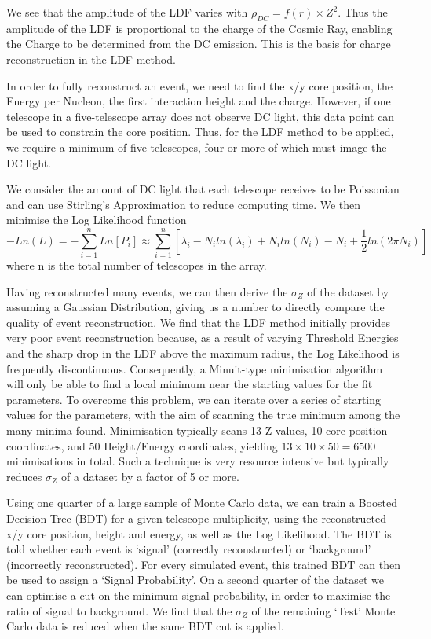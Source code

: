 \documentclass{article}
\begin{document}
We see that the amplitude of the LDF varies with $ \rho_{DC}  = f(r) \times Z^{2}$. Thus the amplitude of the LDF is proportional to the charge of the Cosmic Ray, enabling the Charge to be determined from the DC emission. This is the basis for charge reconstruction in the LDF method. 

In order to fully reconstruct an event, we need to find the x/y core position, the Energy per Nucleon, the first interaction height and the charge. However, if one telescope in a five-telescope array does not observe DC light, this data point can be used to constrain the core position. Thus, for the LDF method to be applied, we require a minimum of five telescopes, four or more of which must image the DC light.

We consider the amount of DC light that each telescope receives to be Poissonian and can use Stirling's Approximation to reduce computing time. We then minimise the Log Likelihood function \[ - Ln(L) = - \sum_{i=1}^{n} Ln [P_{i}] \approx  \sum_{i=1}^{n} [\lambda _{i} - N_{i} ln(\lambda _{i}) + N_{i} ln(N_{i}) - N_{i} + \frac{1}{2} ln(2 \pi N_{i})]  \]
where n is the total number of telescopes in the array.

Having reconstructed many events, we can then derive the $\sigma_{Z}$ of the dataset by assuming a Gaussian Distribution, giving us a number to directly compare the quality of event reconstruction. We find that the LDF method initially provides very poor event reconstruction because, as a result of varying Threshold Energies and the sharp drop in the LDF above the maximum radius, the Log Likelihood is frequently discontinuous. Consequently, a Minuit-type minimisation algorithm will only be able to find a local minimum near the starting values for the fit parameters. To overcome this problem, we can iterate over a series of starting values for the parameters, with the aim of scanning the true minimum among the many minima found. Minimisation typically scans 13 Z values, 10 core position coordinates, and 50 Height/Energy coordinates, yielding $ 13 \times 10 \times 50 = 6500$ minimisations in total. Such a technique is very resource intensive but typically reduces $\sigma_{Z}$ of a dataset by a factor of 5 or more.

Using one quarter of a large sample of Monte Carlo data, we can train a Boosted Decision Tree (BDT) for a given telescope multiplicity, using the reconstructed x/y core position, height and energy, as well as the Log Likelihood. The BDT is told whether each event is \textquoteleft signal' (correctly reconstructed) or \textquoteleft background' (incorrectly reconstructed). For every simulated event, this trained BDT can then be used to assign a \textquoteleft Signal Probability'. On a second quarter of the dataset we can optimise a cut on the minimum signal probability, in order to maximise the ratio of signal to background. We find that the $\sigma_{Z}$ of the remaining \textquoteleft Test' Monte Carlo data is reduced when the same BDT cut is applied.
\end{document}
